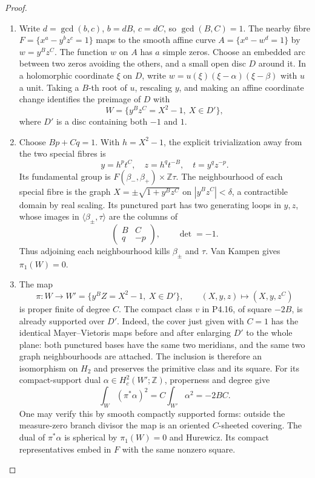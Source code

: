 \begin{proof}

\begin{enumerate}[label={$\langle1\rangle$\arabic*.},leftmargin=*]
\item Write $d=\gcd(b,c)$, $b=dB$, $c=dC$, so $\gcd(B,C)=1$.
The nearby fibre $F=\{x^a-y^bz^c=1\}$ maps to the smooth
affine curve $A=\{x^a-w^d=1\}$ by $w=y^Bz^C$.
The function $w$ on $A$ has $a$ simple zeros. Choose an
embedded arc between two zeros avoiding the others, and a
small open disc $D$ around it. In a holomorphic coordinate
$\xi$ on $D$, write $w=u(\xi)(\xi-\alpha)(\xi-\beta)$
with $u$ a unit. Taking a $B$-th root of $u$, rescaling $y$,
and making an affine coordinate change identifies the preimage
of $D$ with
\[
 W=\{y^Bz^C=X^2-1,\ X\in D'\},
\]
where $D'$ is a disc containing both $-1$ and $1$.

\item Choose $Bp+Cq=1$. With $h=X^2-1$, the explicit trivialization
away from the two special fibres is
\[
 y=h^pt^C,\quad z=h^qt^{-B},\quad t=y^qz^{-p}.
\]
Its fundamental group is $F(\beta_-,\beta_+)\times\mathbb Z\tau$.
The neighbourhood of each special fibre is the graph
$X=\pm\sqrt{1+y^Bz^C}$ on $|y^Bz^C|<\delta$, a contractible
domain by real scaling. Its punctured part has two generating
loops in $y,z$, whose images in $\langle\beta_\pm,\tau\rangle$
are the columns of
\[
 \begin{pmatrix}B&C\\q&-p\end{pmatrix},\qquad \det=-1.
\]
Thus adjoining each neighbourhood kills $\beta_\pm$ and $\tau$.
Van Kampen gives $\pi_1(W)=0$.

\item The map
\[
 \pi:W\longrightarrow W'=\{y^BZ=X^2-1,\ X\in D'\},
 \qquad (X,y,z)\longmapsto(X,y,z^C)
\]
is proper finite of degree $C$. The compact class $v$ in
P4.16, of square $-2B$, is already supported over $D'$.
Indeed, the cover just given with $C=1$ has the identical
Mayer--Vietoris maps before and after enlarging $D'$ to the
whole plane: both punctured bases have the same two meridians,
and the same two graph neighbourhoods are attached. The
inclusion is therefore an isomorphism on $H_2$ and preserves
the primitive class and its square.
For its compact-support dual $\alpha\in H_c^2(W';\mathbb Z)$,
properness and degree give
\[
 \int_W(\pi^*\alpha)^2=C\int_{W'}\alpha^2=-2BC.
\]
One may verify this by smooth compactly supported forms:
outside the measure-zero branch divisor the map is an oriented
$C$-sheeted covering. The dual of $\pi^*\alpha$ is spherical
by $\pi_1(W)=0$ and Hurewicz. Its compact representatives
embed in $F$ with the same nonzero square.


\end{enumerate}
\end{proof}
